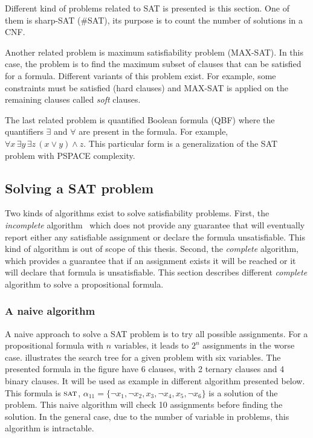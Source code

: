 Different kind of problems related to SAT is presented is this section.
One of them is sharp-SAT (\#SAT), its purpose is to count the number of solutions in a CNF.


Another related problem is maximum satisfiability problem (MAX-SAT). In this case, the problem
is to find the maximum subset of clauses that can be satisfied for a formula. Different variants
of this problem exist. For example, some constraints must be satisfied (hard clauses) and MAX-SAT
is applied on the remaining clauses called \emph{soft} clauses.

The last related problem is quantified Boolean formula (QBF) where the quantifiers $\exists$ and
$\forall$ are present in the formula. For example, $\forall x\, \exists y\, \exists z \, (x \lor y) \land z$.
This particular form is a generalization of the SAT problem with PSPACE complexity.

\subsection{Solving a SAT problem}
Two kinds of algorithms exist to solve satisfiability problems.
First, the \emph{incomplete} algorithm~\cite{biere2009handbook} which does not provide any guarantee that will eventually report either any satisfiable assignment or declare the formula unsatisfiable. This kind of algorithm is out of scope of this thesis. 
Second, the \emph{complete} algorithm, which provides a guarantee that if an assignment exists
it will be reached or it will declare that formula is unsatisfiable.
This section describes different \emph{complete }algorithm to solve a propositional formula.

\subsubsection{A naive algorithm}
A naive approach to solve a SAT problem is to try all possible assignments.
For a propositional formula with $n$ variables, it leads to $2^n$ assignments in the worse case.  
 illustrates the search tree for a given problem with six variables.
The presented formula in the figure have 6 clauses, with 2 ternary clauses and 4 binary clauses.
It will be used as example in different algorithm presented below. This formula is $\textsc{sat}$,
$\alpha_{11} = \{\neg x_1, \neg x_2, x_3, \neg x_4, x_5, \neg x_6 \}$ is a solution of the problem.
This naive algorithm will check 10 assignments before finding the solution. 
In the general case, due to the number of variable in problems, this algorithm is intractable.

